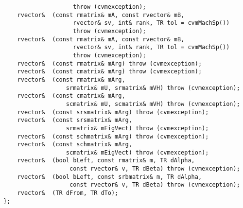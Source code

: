 \verb"                    throw (cvmexception);"\\
\verb"    rvector& "\verb" (const rmatrix& mA, const rvector& mB,"\\
\verb"                    rvector& sv, int& rank, TR tol = cvmMachSp())"\\
\verb"                    throw (cvmexception);"\\
\verb"    rvector& "\verb" (const rmatrix& mA, const rvector& mB,"\\
\verb"                    rvector& sv, int& rank, TR tol = cvmMachSp())"\\
\verb"                    throw (cvmexception);"\\
\verb"    rvector& "\verb" (const rmatrix& mArg) throw (cvmexception);"\\
\verb"    rvector& "\verb" (const cmatrix& mArg) throw (cvmexception);"\\
\verb"    rvector& "\verb" (const rmatrix& mArg,"\\
\verb"                  srmatrix& mU, srmatrix& mVH) throw (cvmexception);"\\
\verb"    rvector& "\verb" (const cmatrix& mArg,"\\
\verb"                  scmatrix& mU, scmatrix& mVH) throw (cvmexception);"\\
\verb"    rvector& "\verb" (const srsmatrix& mArg) throw (cvmexception);"\\
\verb"    rvector& "\verb" (const srsmatrix& mArg,"\\
\verb"                  srmatrix& mEigVect) throw (cvmexception);"\\
\verb"    rvector& "\verb" (const schmatrix& mArg) throw (cvmexception);"\\
\verb"    rvector& "\verb" (const schmatrix& mArg,"\\
\verb"                  scmatrix& mEigVect) throw (cvmexception);"\\
\verb"    rvector& "\verb" (bool bLeft, const rmatrix& m, TR dAlpha,"\\
\verb"                   const rvector& v, TR dBeta) throw (cvmexception);"\\
\verb"    rvector& "\verb" (bool bLeft, const srbmatrix& m, TR dAlpha,"\\
\verb"                   const rvector& v, TR dBeta) throw (cvmexception);"\\
\verb"    rvector& "\verb" (TR dFrom, TR dTo);"\\
\verb"};"
\newpage



